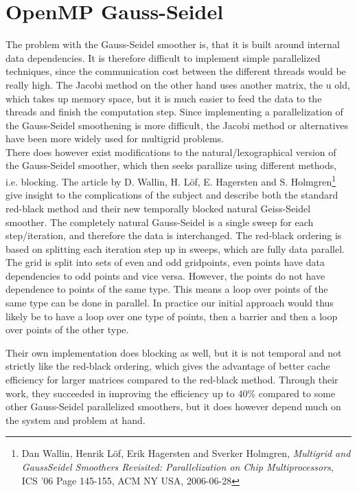 \section{OpenMP Gauss-Seidel}
The problem with the Gauss-Seidel smoother is, that it is built around internal data dependencies. It is therefore difficult to implement simple parallelized techniques, since the communication cost between the different threads would be really high. The Jacobi method on the other hand uses another matrix, the u old, which takes up memory space, but it is much easier to feed the data to the threads and finish the computation step. Since implementing a parallelization of the Gauss-Seidel smoothening is more difficult, the Jacobi method or alternatives have been more widely used for multigrid problems.\\

There does however exist modifications to the natural/lexographical version of the Gauss-Seidel smoother, which then seeks parallize using different methods, i.e. blocking. The article by D. Wallin, H. L\"{o}f, E. Hagersten and S. Holmgren\footnote{Dan Wallin, Henrik L\"{o}f, Erik Hagersten and Sverker Holmgren, \textit{Multigrid and GaussSeidel
Smoothers Revisited:
Parallelization on Chip Multiprocessors}, ICS '06 Page 145-155, ACM NY USA, 2006-06-28}  give insight to the complications of the subject and describe both the standard red-black method and their new temporally blocked natural Geiss-Seidel smoother. The completely natural Gauss-Seidel is a single sweep for each step/iteration, and therefore the data is interchanged. The red-black ordering is based on splitting each iteration step up in sweeps, which are fully data parallel. The grid is split into sets of even and odd gridpoints, even points have data dependencies to odd points and vice versa. However, the points do not have dependence to points of the same type. This means a loop over points of the same type can be done in parallel. In practice our initial approach would thus likely be to have a loop over one type of points, then a barrier and then a loop over points of the other type.

Their own implementation does blocking as well, but it is not temporal and not strictly like the red-black ordering, which gives the advantage of better cache efficiency for larger matrices compared to the red-black method. Through their work, they succeeded in improving the efficiency up to 40\% compared to some other Gauss-Seidel parallelized smoothers, but it does however depend much on the system and problem at hand.\\

